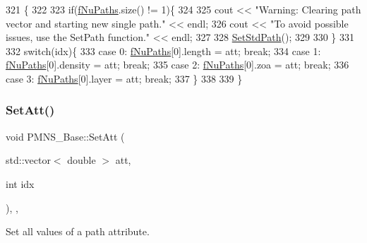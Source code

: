 \begin{DoxyCode}
321                                          \{
322 
323   \textcolor{keywordflow}{if}(\hyperlink{classOscProb_1_1PMNS__Base_a69db9d57e12fc7cbe0431bc6c18fac93}{fNuPaths}.size() != 1)\{
324 
325     cout << \textcolor{stringliteral}{"Warning: Clearing path vector and starting new single path."} << endl;
326     cout << \textcolor{stringliteral}{"To avoid possible issues, use the SetPath function."} << endl;
327 
328     \hyperlink{classOscProb_1_1PMNS__Base_add6533a9fc9acdfc7ae258b62570d78d}{SetStdPath}();
329 
330   \}
331 
332   \textcolor{keywordflow}{switch}(idx)\{
333     \textcolor{keywordflow}{case} 0: \hyperlink{classOscProb_1_1PMNS__Base_a69db9d57e12fc7cbe0431bc6c18fac93}{fNuPaths}[0].length  = att; \textcolor{keywordflow}{break};
334     \textcolor{keywordflow}{case} 1: \hyperlink{classOscProb_1_1PMNS__Base_a69db9d57e12fc7cbe0431bc6c18fac93}{fNuPaths}[0].density = att; \textcolor{keywordflow}{break};
335     \textcolor{keywordflow}{case} 2: \hyperlink{classOscProb_1_1PMNS__Base_a69db9d57e12fc7cbe0431bc6c18fac93}{fNuPaths}[0].zoa     = att; \textcolor{keywordflow}{break};
336     \textcolor{keywordflow}{case} 3: \hyperlink{classOscProb_1_1PMNS__Base_a69db9d57e12fc7cbe0431bc6c18fac93}{fNuPaths}[0].layer   = att; \textcolor{keywordflow}{break};
337   \}
338 
339 \}
\end{DoxyCode}
\mbox{\label{classOscProb_1_1PMNS__Base_aa001479b5f5828c3d16ed087f96ecbcc}} 
\subsubsection{\texorpdfstring{Set\+Att()}{SetAtt()}\hspace{0.1cm}{\footnotesize\ttfamily [2/2]}}
{\footnotesize\ttfamily void P\+M\+N\+S\+\_\+\+Base\+::\+Set\+Att (\begin{DoxyParamCaption}\item[{std\+::vector$<$ double $>$}]{att,  }\item[{int}]{idx }\end{DoxyParamCaption})\hspace{0.3cm}{\ttfamily [protected]}, {\ttfamily [virtual]}, {\ttfamily [inherited]}}

Set all values of a path attribute.

